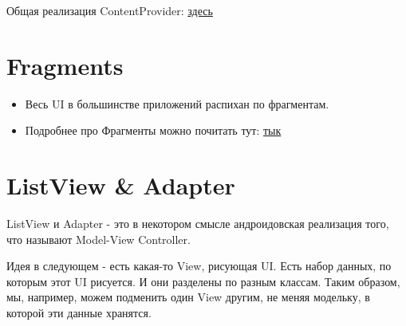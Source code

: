 \documentclass[12 pt]{article}
\begin{document}
    Общая реализация ContentProvider:  
   \href{https://github.com/krinkinmu/forecast/blob/master/app/src/main/java/edu/spbau/android/forecast/WeatherProvider.java}{здесь} 

\section{Fragments}
    \begin{itemize}
	\item Весь UI в большинстве приложений распихан по фрагментам.
	\item Подробнее про Фрагменты можно почитать тут: \href{http://developer.alexanderklimov.ru/android/theory/fragments.php}{тык}
    \end{itemize}
\section{ListView \& Adapter}   
    ListView и Adapter - это в некотором смысле андроидовская реализация того, что называют Model-View Controller.
    
    Идея в следующем - есть какая-то View, рисующая UI. Есть набор данных, по которым этот UI рисуется. И они разделены по разным классам. Таким образом, мы, например, можем подменить один View другим, не меняя модельку, в которой эти данные хранятся.
\end{document}
